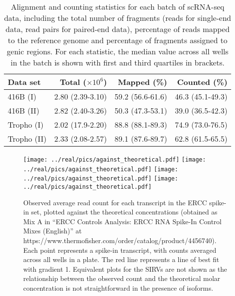 \documentclass{article}
\begin{document}
\begin{table}[btp]
    \caption{Alignment and counting statistics for each batch of scRNA-seq data, including the total number of fragments (reads for single-end data, read pairs for paired-end data), percentage of reads mapped to the reference genome and percentage of fragments assigned to genic regions.
    For each statistic, the median value across all wells in the batch is shown with first and third quartiles in brackets.}
    \begin{center}
        \begin{tabular}{l r r r}
            \hline
            \textbf{Data set} & \textbf{Total ($\times 10^6$)} & \textbf{Mapped (\%)} & \textbf{Counted (\%)} \\
            \hline
            416B (I)  & 2.80 (2.39-3.10) & 59.2 (56.6-61.6) & 46.3 (45.1-49.3) \\
            416B (II) & 2.82 (2.40-3.26) & 50.3 (47.3-53.1) & 39.0 (36.5-42.3) \\
            Tropho (I) & 2.02 (17.9-2.20) & 88.8 (88.1-89.3) & 74.9 (73.0-76.5) \\
            Tropho (II) & 2.33 (2.08-2.57) & 89.1 (87.6-89.7) & 62.8 (61.5-65.5) \\
            \hline
        \end{tabular}
    \end{center}
\end{table}


\begin{figure}[btp]
    \begin{center}
       \texttt{[image: ../real/pics/against\_theoretical.pdf]}
       \texttt{[image: ../real/pics/against\_theoretical.pdf]}
       \texttt{[image: ../real/pics/against\_theoretical.pdf]}
       \texttt{[image: ../real/pics/against\_theoretical.pdf]}
       \caption{Observed average read count for each transcript in the ERCC spike-in set, plotted against the theoretical concentrations (obtained as Mix A in ``ERCC Controls Analysis: ERCC RNA Spike-In Control Mixes (English)'' at https://www.thermofisher.com/order/catalog/product/4456740).
        Each point represents a spike-in transcript, with counts averaged across all wells in a plate.
        The red line represents a line of best fit with gradient 1.
        Equivalent plots for the SIRVs are not shown as the relationship between the observed count and the theoretical molar concentration is not straightforward in the presence of isoforms.
       }
    \end{center}
\end{figure}
\end{document}
